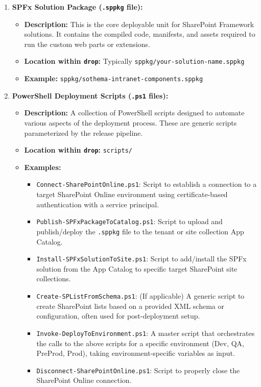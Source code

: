 \begin{enumerate}
    \item \textbf{SPFx Solution Package (\texttt{.sppkg} file):}
    \begin{itemize}
        \item \textbf{Description:} This is the core deployable unit for SharePoint Framework solutions. It contains the compiled code, manifests, and assets required to run the custom web parts or extensions.
        \item \textbf{Location within \texttt{drop}:} Typically \texttt{sppkg/your-solution-name.sppkg}
        \item \textbf{Example:} \texttt{sppkg/sothema-intranet-components.sppkg}
    \end{itemize}

    \item \textbf{PowerShell Deployment Scripts (\texttt{.ps1} files):}
    \begin{itemize}
        \item \textbf{Description:} A collection of PowerShell scripts designed to automate various aspects of the deployment process. These are generic scripts parameterized by the release pipeline.
        \item \textbf{Location within \texttt{drop}:} \texttt{scripts/}
        \item \textbf{Examples:}
        \begin{itemize}
            \item \texttt{Connect-SharePointOnline.ps1}: Script to establish a connection to a target SharePoint Online environment using certificate-based authentication with a service principal.
            \item \texttt{Publish-SPFxPackageToCatalog.ps1}: Script to upload and publish/deploy the \texttt{.sppkg} file to the tenant or site collection App Catalog.
            \item \texttt{Install-SPFxSolutionToSite.ps1}: Script to add/install the SPFx solution from the App Catalog to specific target SharePoint site collections.
            \item \texttt{Create-SPListFromSchema.ps1}: (If applicable) A generic script to create SharePoint lists based on a provided XML schema or configuration, often used for post-deployment setup.
            \item \texttt{Invoke-DeployToEnvironment.ps1}: A master script that orchestrates the calls to the above scripts for a specific environment (Dev, QA, PreProd, Prod), taking environment-specific variables as input.
            \item \texttt{Disconnect-SharePointOnline.ps1}: Script to properly close the SharePoint Online connection.
        \end{itemize}
    \end{itemize}


\end{enumerate}
